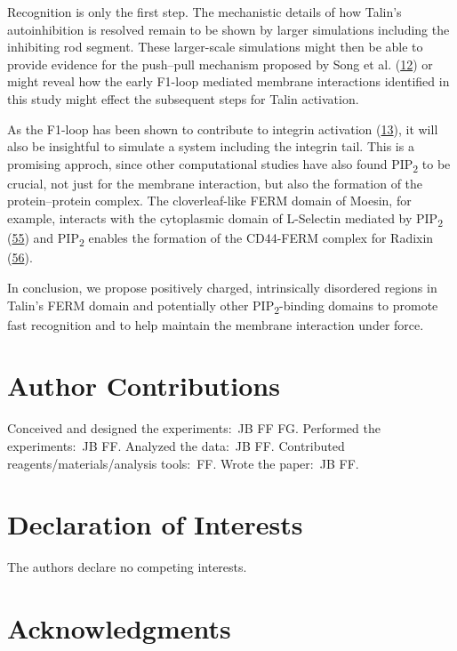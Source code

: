 \documentclass[
  twocolumn]{biophys-new-mod}
\begin{document}
Recognition is only the first step. The mechanistic details of how
Talin's autoinhibition is resolved remain to be shown by larger
simulations including the inhibiting rod segment. These larger-scale
simulations might then be able to provide evidence for the push--pull
mechanism proposed by Song et al.
(\protect\hyperlink{ref-songNovelMembranedependentSwitch2012a}{12}) or
might reveal how the early F1-loop mediated membrane interactions
identified in this study might effect the subsequent steps for Talin
activation.

As the F1-loop has been shown to contribute to integrin activation
(\protect\hyperlink{ref-goultStructureDoubleUbiquitinlike2010}{13}), it
will also be insightful to simulate a system including the integrin
tail. This is a promising approch, since other computational studies
have also found PIP\textsubscript{2} to be crucial, not just for the
membrane interaction, but also the formation of the protein--protein
complex. The cloverleaf-like FERM domain of Moesin, for example,
interacts with the cytoplasmic domain of L-Selectin mediated by
PIP\textsubscript{2}
(\protect\hyperlink{ref-sunMolecularDynamicsAssociation2018}{55}) and
PIP\textsubscript{2} enables the formation of the CD44-FERM complex for
Radixin
(\protect\hyperlink{ref-sunMolecularMechanismBidirectional2020}{56}).

In conclusion, we propose positively charged, intrinsically disordered
regions in Talin's FERM domain and potentially other
PIP\textsubscript{2}-binding domains to promote fast recognition and to
help maintain the membrane interaction under force.

\hypertarget{author-contributions}{%
\section{Author Contributions}\label{author-contributions}}

Conceived and designed the experiments:~JB FF FG. Performed the
experiments:~JB FF. Analyzed the data:~JB FF. Contributed
reagents/materials/analysis tools:~FF. Wrote the paper:~JB FF.

\hypertarget{declaration-of-interests}{%
\section{Declaration of Interests}\label{declaration-of-interests}}

The authors declare no competing interests.

\hypertarget{acknowledgments}{%
\section{Acknowledgments}\label{acknowledgments}}
\end{document}
